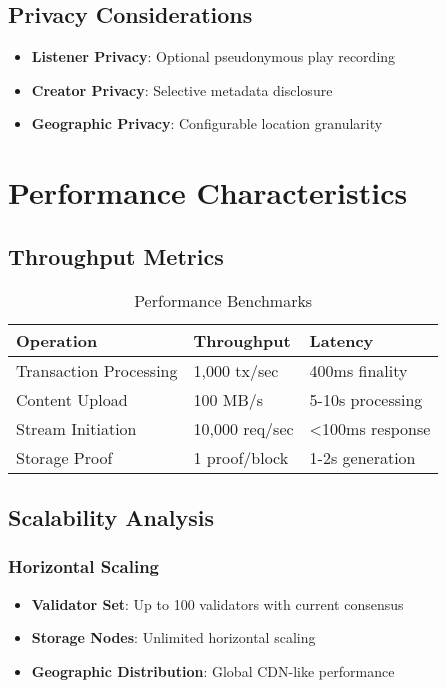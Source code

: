\documentclass[11pt,a4paper]{article}
\begin{document}
\subsection{Privacy Considerations}

\begin{itemize}
  \item \textbf{Listener Privacy}: Optional pseudonymous play recording
  \item \textbf{Creator Privacy}: Selective metadata disclosure
  \item \textbf{Geographic Privacy}: Configurable location granularity
\end{itemize}

\section{Performance Characteristics}

\subsection{Throughput Metrics}

\begin{table}[H]
  \centering
  \begin{tabular}{|l|l|l|}
    \hline
    \textbf{Operation} & \textbf{Throughput} & \textbf{Latency} \\
    \hline
    Transaction Processing & 1,000 tx/sec & 400ms finality \\
    Content Upload & 100 MB/s & 5-10s processing \\
    Stream Initiation & 10,000 req/sec & <100ms response \\
    Storage Proof & 1 proof/block & 1-2s generation \\
    \hline
  \end{tabular}
  \caption{Performance Benchmarks}
\end{table}

\subsection{Scalability Analysis}

\subsubsection{Horizontal Scaling}
\begin{itemize}
  \item \textbf{Validator Set}: Up to 100 validators with current consensus
  \item \textbf{Storage Nodes}: Unlimited horizontal scaling
  \item \textbf{Geographic Distribution}: Global CDN-like performance
\end{itemize}
\end{document}
